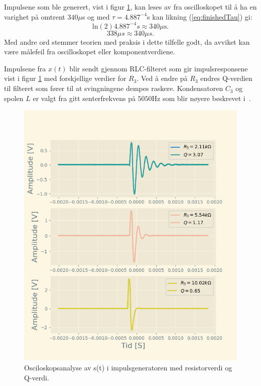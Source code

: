 \documentclass[a4paper,11pt,norsk]{article}
\begin{document}
Impulsene som ble generert, vist i figur \ref{fig:impulsrespons}, kan leses av fra oscilloskopet til å ha en varighet på omtrent $340\mu$s og med $\tau = 4.887^{-4}$s kan likning (\ref{eq:finishedTau}) gi:
\begin{equation}
    \text{ln}(2)4.887^{-4}s\approx340\mu\text{s}.
\end{equation}
\begin{equation}
    338\mu s \approx 340\mu s.
\end{equation}
Med andre ord stemmer teorien med praksis i dette tilfelle godt, da avviket kan være målefeil fra oscilloskopet eller komponentverdiene.

Impulsene fra $x(t)$ blir sendt gjennom RLC-filteret som gir impulsresponsene vist i figur \ref{fig:impulsrespons} med forskjellige verdier for $R_3$. Ved å endre på $R_3$ endres Q-verdien til filteret som fører til at svingningene dempes raskere. Kondensatoren $C_3$ og spolen $L$ er valgt fra gitt senterfrekvens på $5050$Hz som blir nøyere beskrevet i~\cite{D2}.
\begin{figure}[H]
  \centering
  \includegraphics[scale=0.65]{D1/Images/Dempningsfaktor.png}
  \caption{Osciloskopsanalyse av s(t) i impulsgeneratoren med resistorverdi og Q-verdi.}
  \label{fig:impulsrespons}
\end{figure}
\end{document}
